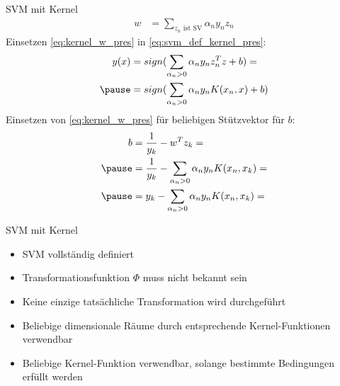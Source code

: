 \documentclass[ngerman]{beamer}
\begin{document}
\begin{frame}{SVM mit Kernel}
    \begin{equation} \label{eq:kernel_w_pres}
    \begin{aligned}
        w &= \sum_{z_{n} \text{ ist SV}} \alpha_{n} y_{n} z_{n}
    \end{aligned}
    \end{equation} \pause
    Einsetzen \cref{eq:kernel_w_pres} in \cref{eq:svm_def_kernel_pres}: \\ \pause
    \begin{equation*} \label{eq:svm_def_kernel2_pres}
    \begin{aligned}
        y(x) &= sign(\sum_{\alpha_{n} > 0} \alpha_{n} y_{n} z_{n}^{T} z + b) = \\ \pause
        &= sign(\sum_{\alpha_{n} > 0} \alpha_{n} y_{n} K(x_{n}, x) + b)
    \end{aligned}
    \end{equation*} \pause
    Einsetzen von \cref{eq:kernel_w_pres} für beliebigen Stützvektor für $b$: \pause
    \begin{equation*}
        \begin{aligned}
            b &= \frac{1}{y_{k}} - w^{T} z_{k} = \\ \pause
            &= \frac{1}{y_{k}} - \sum_{\alpha_{n} > 0} \alpha_{n} y_{n} K(x_{n}, x_{k}) = \\ \pause
            &= y_{k} - \sum_{\alpha_{n} > 0} \alpha_{n} y_{n} K(x_{n}, x_{k}) = \\
        \end{aligned}
    \end{equation*}
\end{frame}

\begin{frame}{SVM mit Kernel}
    \begin{itemize}
        \item SVM vollständig definiert \pause
        \item Transformationsfunktion $\Phi$ muss nicht bekannt sein \pause
        \item Keine einzige tatsächliche Transformation wird durchgeführt \pause
        \item Beliebige dimensionale Räume durch entsprechende Kernel-Funktionen verwendbar \pause
        \item Beliebige Kernel-Funktion verwendbar, solange bestimmte Bedingungen erfüllt werden
    \end{itemize}
\end{frame}
\end{document}
